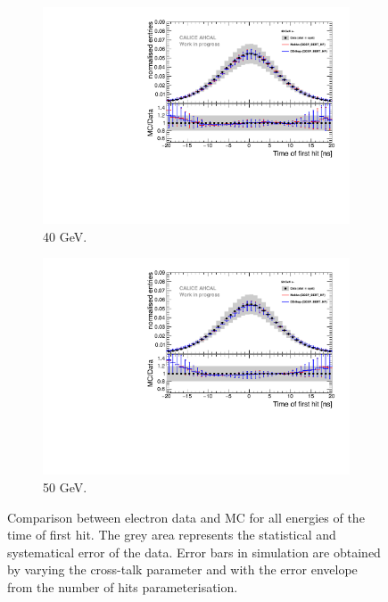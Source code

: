 \begin{figure}[htbp!]
\begin{subfigure}[t]{0.45\textwidth}
		\includegraphics[width=1\textwidth]{chap5/fig_AHCAL_timing/Electrons/Comparison_SimData_Electrons40GeV.pdf}
		\caption{40 GeV.}\label{fig:elec_sim_data_40GeV}
	\end{subfigure}
	\hfill
	\begin{subfigure}[t]{0.45\textwidth}
		\centering
		\includegraphics[width=1\textwidth]{chap5/fig_AHCAL_timing/Electrons/Comparison_SimData_Electrons50GeV.pdf}
		\caption{50 GeV.}\label{fig:elec_sim_data_50GeV}
	\end{subfigure}
	\caption{Comparison between electron data and MC for all energies of the time of first hit. The grey area represents the statistical and systematical error of the data. Error bars in simulation are obtained by varying the cross-talk parameter and with the error envelope from the number of hits parameterisation.}
	\label{fig:sim_data_elec}
\end{figure}

